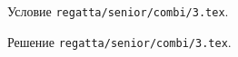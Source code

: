 \problem
Условие \texttt{regatta/senior/combi/3.tex}.

\solution Решение \texttt{regatta/senior/combi/3.tex}.
\endproblem
